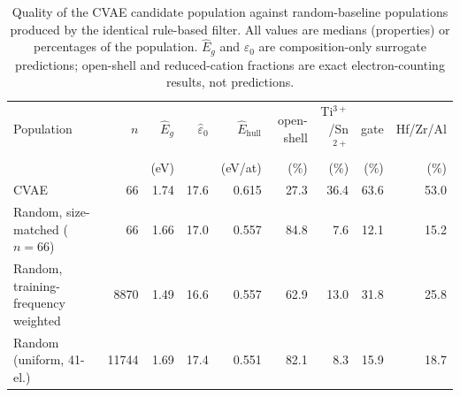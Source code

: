 \begin{table}[t]
\centering
\small
\caption{Quality of the CVAE candidate population against random-baseline populations produced by the identical rule-based filter. All values are medians (properties) or percentages of the population. $\hat{E}_g$ and $\hat\varepsilon_0$ are composition-only surrogate predictions; open-shell and reduced-cation fractions are exact electron-counting results, not predictions.}
\label{tab:a7_overview}
\begin{tabular}{lrrrrrrrr}
\toprule
Population & $n$ & $\hat{E}_g$ & $\hat\varepsilon_0$ & $\hat{E}_{\mathrm{hull}}$ & open-shell & Ti$^{3+}$/Sn$^{2+}$ & gate & Hf/Zr/Al \\
 & & (eV) & & (eV/at) & (\%) & (\%) & (\%) & (\%) \\
\midrule
CVAE & 66 & 1.74 & 17.6 & 0.615 & 27.3 & 36.4 & 63.6 & 53.0 \\
Random, size-matched ($n=66$) & 66 & 1.66 & 17.0 & 0.557 & 84.8 & 7.6 & 12.1 & 15.2 \\
Random, training-frequency weighted & 8870 & 1.49 & 16.6 & 0.557 & 62.9 & 13.0 & 31.8 & 25.8 \\
Random (uniform, 41-el.) & 11744 & 1.69 & 17.4 & 0.551 & 82.1 & 8.3 & 15.9 & 18.7 \\
\bottomrule
\end{tabular}
\end{table}

